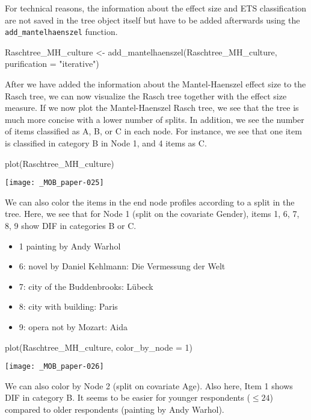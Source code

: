 \documentclass[doc,floatsintext,natbib]{apa7}
\begin{document}
For technical reasons, the information about the effect size and ETS classification are not saved in the tree object itself but have to be added afterwards using the \texttt{add\_mantelhaenszel} function. 

\begin{Schunk}
\begin{Sinput}
 Raschtree_MH_culture <- add_mantelhaenszel(Raschtree_MH_culture, 
                                            purification = "iterative")
\end{Sinput}
\end{Schunk}

After we have added the information about the Mantel-Haenszel effect size to the Rasch tree, we can now visualize the Rasch tree together with the effect size measure. If we now plot the Mantel-Haenszel Rasch tree, we see that the tree is much more concise with a lower number of splits. In addition, we see the number of items classified as A, B, or C in each node. For instance, we see that one item is classified in category B in Node 1, and 4 items as C.

\begin{Schunk}
\begin{Sinput}
 plot(Raschtree_MH_culture)
\end{Sinput}
\end{Schunk}
\texttt{[image: \_MOB\_paper-025]}

We can also color the items in the end node profiles according to a split in the tree. Here, we see that for Node 1 (split on the covariate Gender), items 1, 6, 7, 8, 9 show DIF in categories B or C. 

\begin{itemize}
\item 1 painting by Andy Warhol
\item 6: novel by Daniel Kehlmann: Die Vermessung der Welt
\item 7: city of the Buddenbrooks: Lübeck
\item 8: city with building: Paris
\item 9: opera not by Mozart: Aida
\end{itemize}

\begin{Schunk}
\begin{Sinput}
 plot(Raschtree_MH_culture, color_by_node = 1)
\end{Sinput}
\end{Schunk}
\texttt{[image: \_MOB\_paper-026]}

We can also color by Node 2 (split on covariate Age). Also here, Item 1 shows DIF in category B. It seems to be easier for younger respondents ($\leq 24$) compared to older respondents (painting by Andy Warhol).  
\end{document}

